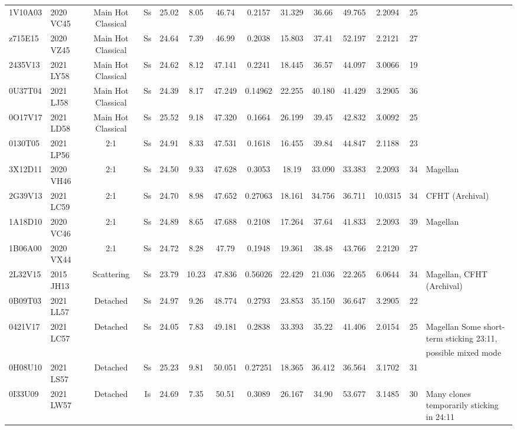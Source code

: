 \begin{longrotatetable}
\begin{longtable}{ll|ccccccccccc | l}
1V10A03 & 2020 VC45 & Main Hot Classical & Ss & 25.02 & 8.05 & 46.74 & 0.2157 & 31.329 & 36.66 & 49.765 & 2.2094 & 25 & \\ 
z715E15 & 2020 VZ45 & Main Hot Classical & Ss & 24.64 & 7.39 & 46.99 & 0.2038 & 15.803 & 37.41 & 52.197 & 2.2121 & 27 & \\ 
2435V13 & 2021 LY58 & Main Hot Classical & Ss & 24.62 & 8.12 & 47.141 & 0.2241 & 18.445 & 36.57 & 44.097 & 3.0066 & 19 & \\ 
0U37T04 & 2021 LJ58 & Main Hot Classical & Ss & 24.39 & 8.17 & 47.249 & 0.14962 & 22.255 & 40.180 & 41.429 & 3.2905 & 36 & \\ 
0O17V17 & 2021 LD58 & Main Hot Classical & Ss & 25.52 & 9.18 & 47.320 & 0.1664 & 26.199 & 39.45 & 42.832 & 3.0092 & 25 & \\ 
0130T05 & 2021 LP56 & 2:1 & Ss & 24.91 & 8.33 & 47.531 & 0.1618 & 16.455 & 39.84 & 44.847 & 2.1188 & 23 & \\ 
3X12D11 & 2020 VH46 & 2:1 & Ss & 24.50 & 9.33 & 47.628 & 0.3053 & 18.19 & 33.090 & 33.383 & 2.2093 & 34 & Magellan  \\ 
2G39V13 & 2021 LC59 & 2:1 & Ss & 24.70 & 8.98 & 47.652 & 0.27063 & 18.161 & 34.756 & 36.711 & 10.0315 & 34 & CFHT (Archival)  \\ 
1A18D10 & 2020 VC46 & 2:1 & Ss & 24.89 & 8.65 & 47.688 & 0.2108 & 17.264 & 37.64 & 41.833 & 2.2093 & 39 & Magellan  \\ 
1B06A00 & 2020 VX44 & 2:1 & Ss & 24.72 & 8.28 & 47.79 & 0.1948 & 19.361 & 38.48 & 43.766 & 2.2120 & 27 & \\ 
2L32V15 & 2015 JH13 & Scattering & Ss & 23.79 & 10.23 & 47.836 & 0.56026 & 22.429 & 21.036 & 22.265 & 6.0644 & 34 & Magellan, CFHT (Archival)  \\ 
0B09T03 & 2021 LL57 & Detached & Ss & 24.97 & 9.26 & 48.774 & 0.2793 & 23.853 & 35.150 & 36.647 & 3.2905 & 22 & \\ 
0421V17 & 2021 LC57 & Detached & Ss & 24.05 & 7.83 & 49.181 & 0.2838 & 33.393 & 35.22 & 41.406 & 2.0154 & 25 & Magellan  Some short-term sticking 23:11, \\  &  & & &  & & &  & & & &  &  &   possible mixed mode  \\ 
0H08U10 & 2021 LS57 & Detached & Ss & 25.23 & 9.81 & 50.051 & 0.27251 & 18.365 & 36.412 & 36.564 & 3.1702 & 31 & \\ 
0I33U09 & 2021 LW57 & Detached & Is & 24.69 & 7.35 & 50.51 & 0.3089 & 26.167 & 34.90 & 53.677 & 3.1485 & 30 & Many clones temporarily sticking in 24:11  \\ 

\end{longtable}
\end{longrotatetable}

